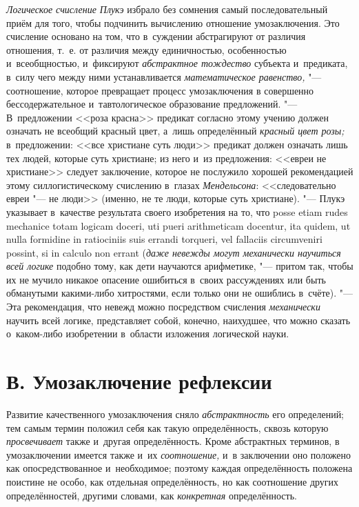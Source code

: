{\em Логическое счисление Плукэ}
избрало без сомнения самый последовательный приём для того,
чтобы подчинить вычислению отношение умозаключения. Это счисление основано
на том, что в~суждении абстрагируют от различия отношения, т.~е. от
различия между единичностью, особенностью и~всеобщностью, и~фиксируют
{\em абстрактное тождество}
субъекта и~предиката, в~силу чего между ними устанавливается
{\em математическое равенство,} "---
соотношение, которое превращает процесс умозаключения в
совершенно бессодержательное и~тавтологическое образование предложений. "---
В~предложении <<роза красна>> предикат согласно этому учению
должен означать не всеобщий красный цвет, а~лишь определённый
{\em красный цвет розы;}
в~предложении: <<все христиане суть люди>> предикат должен
означать лишь тех людей, которые суть христиане; из него и~из предложения:
<<евреи не христиане>> следует заключение, которое не послужило хорошей
рекомендацией этому силлогистическому счислению в~глазах
{\em Мендельсона}:
<<следовательно евреи "--- не люди>> (именно, не те
люди, которые суть христиане). "--- Плукэ указывает в~качестве
результата своего изобретения на то, что posse etiam rudes mechanice totam
logicam doceri, uti pueri arithme\-ticam docentur, ita quidem, ut nulla
formidine in ratiociniis suis errandi torqueri, vel fallaciis circum\-veniri
possint, si in calculo non errant
({\em даже невежды могут механически
научиться всей логике} подобно тому, как дети научаются
арифметике, "--- притом так, чтобы их не мучило никакое
опасение ошибиться в~своих рассуждениях или быть обманутыми какими-либо
хитростями, если только они не ошиблись в~счёте). "--- Эта
рекомендация, что невежд можно посредством счисления
{\em механически} научить
всей логике, представляет собой, конечно, наихудшее, что
можно сказать о~каком-либо изобретении в~области изложения логической
науки.

\section[В. Умозаключение рефлексии]{В. Умозаключение рефлексии}

Развитие качественного умозаключения сняло
{\em абстрактность} его
определений; тем самым термин положил себя как такую определённость, сквозь
которую {\em просвечивает}
также и~другая определённость. Кроме абстрактных терминов, в
умозаключении имеется также и~их
{\em соотношение,} и~в
заключении оно положено как опосредствованное и~необходимое; поэтому каждая
определённость положена поистине не особо, как отдельная определённость, но
как соотношение других определённостей, другими словами, как
{\em конкретная} определённость.

